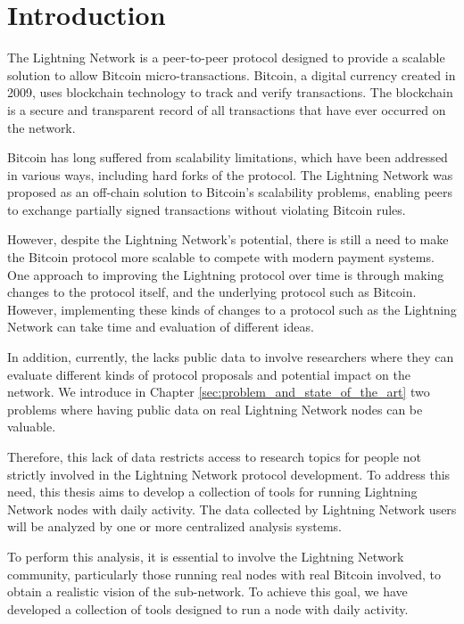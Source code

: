 \setcounter{page}{1}
\chapter{Introduction}\label{sec:introduction}

The Lightning Network is a peer-to-peer protocol designed to
provide a scalable solution to allow Bitcoin micro-transactions.
Bitcoin, a digital currency created in 2009, uses blockchain technology
to track and verify transactions. The blockchain is a secure and transparent
record of all transactions that have ever occurred on the network.

Bitcoin has long suffered from scalability limitations, which have been
addressed in various ways, including hard forks of the protocol.
The Lightning Network was proposed as an off-chain solution to Bitcoin's
scalability problems, enabling peers to exchange partially signed transactions
without violating Bitcoin rules.

However, despite the Lightning Network's potential, there is still a need
to make the Bitcoin protocol more scalable to compete with modern payment systems.
One approach to improving the Lightning protocol over time is through making changes
to the protocol itself, and the underlying protocol such as Bitcoin. However,
implementing these kinds of changes to a protocol such as the Lightning Network
can take time and evaluation of different ideas.

In addition, currently, the {\LN} lacks public data to involve researchers
where they can evaluate different kinds of protocol proposals and
potential impact on the network. We introduce in Chapter \ref{sec:problem_and_state_of_the_art}
two problems where having public data on real Lightning Network nodes can be valuable.

Therefore, this lack of data restricts access to research topics for
people not strictly involved in the Lightning Network protocol development.
To address this need, this thesis aims to develop a collection of tools for
running Lightning Network nodes with daily activity. The data collected by
Lightning Network users will be analyzed by one or more centralized
analysis systems.

To perform this analysis, it is essential to involve the Lightning Network
community, particularly those running real nodes with real Bitcoin involved,
to obtain a realistic vision of the sub-network. To achieve this goal, we have
developed a collection of tools designed to run a node with daily activity.

